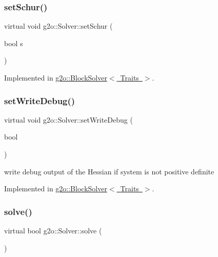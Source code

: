 \subsubsection{\texorpdfstring{set\+Schur()}{setSchur()}}
{\footnotesize\ttfamily virtual void g2o\+::\+Solver\+::set\+Schur (\begin{DoxyParamCaption}\item[{bool}]{s }\end{DoxyParamCaption})\hspace{0.3cm}{\ttfamily [pure virtual]}}



Implemented in \mbox{\hyperlink{classg2o_1_1_block_solver_a6dd8e7e7a099410005cb96ff874d8866}{g2o\+::\+Block\+Solver$<$ Traits $>$}}.

\mbox{\label{classg2o_1_1_solver_ad3ef2a487d991363ba86af2840b0d7cd}} 
\subsubsection{\texorpdfstring{set\+Write\+Debug()}{setWriteDebug()}}
{\footnotesize\ttfamily virtual void g2o\+::\+Solver\+::set\+Write\+Debug (\begin{DoxyParamCaption}\item[{bool}]{ }\end{DoxyParamCaption})\hspace{0.3cm}{\ttfamily [pure virtual]}}

write debug output of the Hessian if system is not positive definite 

Implemented in \mbox{\hyperlink{classg2o_1_1_block_solver_a1bff5dc13e3408fa76c019347104acd0}{g2o\+::\+Block\+Solver$<$ Traits $>$}}.

\mbox{\label{classg2o_1_1_solver_a9c359a886db57f2f81e54a2113f3bd38}} 
\subsubsection{\texorpdfstring{solve()}{solve()}}
{\footnotesize\ttfamily virtual bool g2o\+::\+Solver\+::solve (\begin{DoxyParamCaption}{ }\end{DoxyParamCaption})\hspace{0.3cm}{\ttfamily [pure virtual]}}

